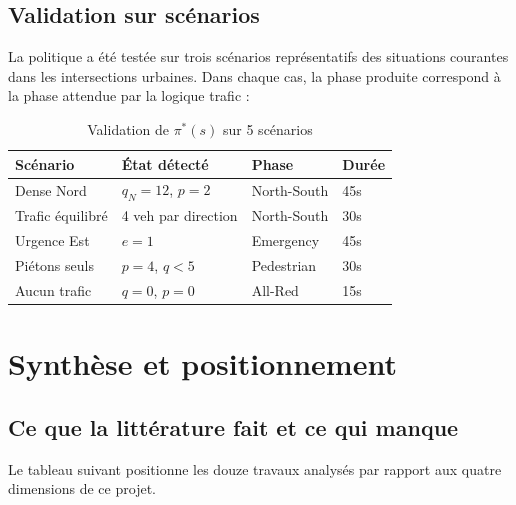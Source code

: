 \subsection{Validation sur scénarios}

La politique a été testée sur trois scénarios
représentatifs des situations courantes dans
les intersections urbaines. Dans chaque cas,
la phase produite correspond à la phase
attendue par la logique trafic :

\begin{table}[H]
\centering
\caption{Validation de $\pi^*(s)$ sur
         5 scénarios}
\begin{tabularx}{\textwidth}{lXll}
\toprule
\textbf{Scénario} &
\textbf{État détecté} &
\textbf{Phase} &
\textbf{Durée} \\
\midrule
Dense Nord &
$q_N=12$, $p=2$ &
North-South & 45s \\
Trafic équilibré &
4 veh par direction &
North-South & 30s \\
Urgence Est &
$e=1$ &
Emergency & 45s \\
Piétons seuls &
$p=4$, $q<5$ &
Pedestrian & 30s \\
Aucun trafic &
$q=0$, $p=0$ &
All-Red & 15s \\
\bottomrule
\end{tabularx}
\label{tab:validation_mdp}
\end{table}

\section{Synthèse et positionnement}

\subsection{Ce que la littérature fait
            et ce qui manque}

Le tableau suivant positionne les douze
travaux analysés par rapport aux quatre
dimensions de ce projet.

